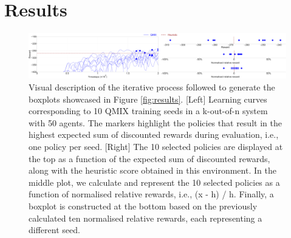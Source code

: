 \section{Results}\label{sec:ch5_results}

\begin{figure}
    \centering
    \includegraphics[width=\textwidth]{tex_thesis/figures/ch5/plot_explain_plot_gaussian.pdf}
    \caption{Visual description of the iterative process followed to generate the boxplots showcased in Figure \ref{fig:results}.
[Left] Learning curves corresponding to 10 QMIX training seeds in a k-out-of-n system with 50 agents. 
The markers highlight the policies that result in the highest expected sum of discounted rewards during evaluation, i.e., one policy per seed.
[Right] The 10 selected policies are displayed at the top as a function of the expected sum of discounted rewards, along with the heuristic score obtained in this environment.
In the middle plot, we calculate and represent the 10 selected policies as a function of normalised relative rewards, i.e., (x - h) / h.
Finally, a boxplot is constructed at the bottom based on the previously calculated ten normalised relative rewards, each representing a different seed.
}
\label{fig:explain_fig}
\end{figure}



